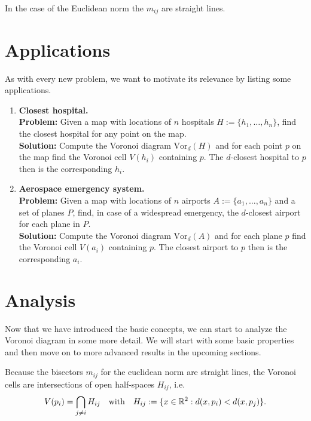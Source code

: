    \begin{remark}
        In the case of the Euclidean norm the $m_{ij}$ are straight lines. 
    \end{remark}
    
\section{Applications}
    As with every new problem, we want to motivate its relevance by listing some applications.
    \begin{enumerate}
        \item \textbf{Closest hospital.} \\
        \textbf{Problem:} Given a map with locations of $n$ hospitals $H := \{h_1, \dots, h_n\}$, find the closest hospital for any point on the map. \\
        \textbf{Solution:} Compute the Voronoi diagram $\text{Vor}_d(H)$ and for each point $p$ on the map find the Voronoi cell $V(h_i)$ containing $p$. The $d$-closest hospital to $p$ then is the corresponding $h_i$. 

        \item \textbf{Aerospace emergency system.} \\
        \textbf{Problem:} Given a map with locations of $n$ airports $A := \{a_1, \dots, a_n\}$ and a set of planes $P$, find, in case of a widespread emergency, the $d$-closest airport for each plane in $P$. \\
        \textbf{Solution:} Compute the Voronoi diagram $\text{Vor}_d(A)$ and for each plane $p$ find the Voronoi cell $V(a_i)$ containing $p$. The closest airport to $p$ then is the corresponding $a_i$. 
    \end{enumerate}

\section{Analysis}
    Now that we have introduced the basic concepts, we can start to analyze the Voronoi diagram in some more detail. We will start with some basic properties and then move on to more advanced results in the upcoming sections. \\

    \begin{remark} 
        Because the bisectors $m_{ij}$ for the euclidean norm are straight lines, the Voronoi cells are intersections of open half-spaces $H_{ij}$, i.e.
        $$V(p_i) = \bigcap_{j \neq i} H_{ij} \quad\text{with}\quad H_{ij} := \{x \in \mathbb{R}^2 : d(x, p_i) < d(x, p_j)\} .$$ 
    \end{remark}

